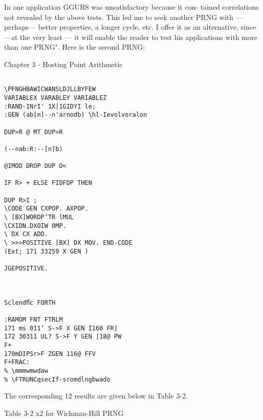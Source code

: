  

 

 

In one application GGUBS was unsatisfactory because it con-
tained correlations not revealed by the above tests. This led me
to seek another PRNG with —perhaps— better properties, a
longer cycle, etc. I offer it as an alternative, since —at the very
least — it will enable the reader to test his applications with more
than one PRNG". Here is the second PRNG:

Chapter 3 - Hosting Point Arithmetic
\begin{verbatim}

\PFNGHBAWICWANSLDJLLBYFEW
VARIABLEX VARABLEY VARIABLEZ
:RAND-INrI' 1X|1GIDYI le;
:GEN (ab[n]--n'arnodb) \hl-Ievolvoralon

DUP>R @ MT DUP>R

(--nab:R:--[n]b)

@IMOD DROP DUP O<

IF R> + ELSE FIDFDP THEN

DUP R>I ;
\CODE GEN CXPOP. AXPOP.
\ [BX]WORDP’TR lMUL
\CXIDN.DXOIW 0MP.
\ DX CX ADD.
\ >>>POSITIVE [BX] DX MOV. END-CODE
(Ext; 171 33259 X GEN )

JGEPOSITIVE.

 

Sclendﬂc FORTH

:RAMOM FNT FTRLM
171 ms 011’ S->F X GEN I160 FR]
172 30311 UL? S->F Y GEN |18@ PW
F+
170mDIPSr>F ZGEN 116@ FFV
F+FRAC:
% \mmmwmwdaw
% \FTRUNCqsecIf-sromdlngbwado
\end{verbatim}
The corresponding 12 results are given below in Table 3-2.

Table 3-2 x2 for Wichman-Hill PRNG


